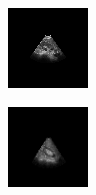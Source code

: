 \begin{figure}[htb]
        \begin{subfigure}[b]{0.245\textwidth}
                \centering
                \includegraphics[width=\linewidth]{img_seg/70_post}
        \end{subfigure}%
        \hspace{1px}
        \begin{subfigure}[b]{0.245\textwidth}
                \centering
                \includegraphics[width=\linewidth]{img_seg/71_post}

\end{subfigure}
\end{figure}
